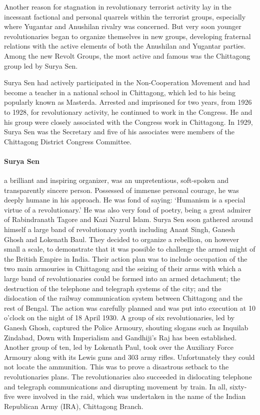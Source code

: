 \begin{multicols}{2}
Another reason for stagnation in revolutionary terrorist activity lay in the incessant factional and personal quarrels within the terrorist groups, especially where Yugantar and Anushilan rivalry was concerned. But very soon younger revolutionaries began to organize themselves in new groups, developing fraternal relations with the active elements of both the Anushilan and Yugantar parties. Among the new Revolt Groups, the most active and famous was the Chittagong group led by Surya Sen.

Surya Sen had actively participated in the Non-Cooperation Movement and had become a teacher in a national school in Chittagong, which led to his being popularly known as Masterda. Arrested and imprisoned for two years, from 1926 to 1928, for revolutionary activity, he continued to work in the Congress. He and his group were closely associated with the Congress work in Chittagong. In 1929, Surya Sen was the Secretary and five of his associates were members of the Chittagong District Congress Committee.

\paragraph{Surya Sen} a brilliant and inspiring organizer, was an unpretentious, soft-spoken and transparently sincere person. Possessed of immense personal courage, he was deeply humane in his approach. He was fond of saying: `Humanism is a special virtue of a revolutionary.' He was also very fond of poetry, being a great admirer of Rabindranath Tagore and Kazi Nazrul Islam. Surya Sen soon gathered around himself a large band of revolutionary youth including Anant Singh, Ganesh Ghosh and Lokenath Baul. They decided to organize a rebellion, on however small a scale, to demonstrate that it was possible to challenge the armed might of the British Empire in India. Their action plan was to include occupation of the two main armouries in Chittagong and the seizing of their arms with which a large band of revolutionaries could be formed into an armed detachment; the destruction of the telephone and telegraph systems of the city; and the dislocation of the railway communication system between Chittagong and the rest of Bengal. The action was carefully planned and was put into execution at 10 o'clock on the night of 18 April 1930. A group of six revolutionaries, led by Ganesh Ghosh, captured the Police Armoury, shouting slogans such as Inquilab Zindabad, Down with Imperialism and Gandhiji's Raj has been established. Another group of ten, led by Lokenath Paul, took over the Auxiliary Force Armoury along with its Lewis guns and 303 army rifles. Unfortunately they could not locate the ammunition. This was to prove a disastrous setback to the revolutionaries plans. The revolutionaries also succeeded in dislocating telephone and telegraph communications and disrupting movement by train. In all, sixty-five were involved in the raid, which was undertaken in the name of the Indian Republican Army (IRA), Chittagong Branch.


\end{multicols}
